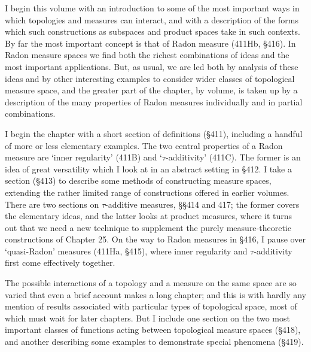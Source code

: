       
\def\chaptername{Topologies and Measures I} 
\def\chaptername{Topologies and measures I} 
      
I begin this volume with an introduction to some of the most important 
ways in which topologies and measures can interact, and with a 
description of 
the forms which such constructions as subspaces and product spaces take 
in such contexts.   By far the most important concept is that of Radon 
measure (411Hb, \S416).   In Radon measure spaces we find both the 
richest combinations of ideas and the most important applications. 
But, as usual, we are led both by analysis of these ideas and by other 
interesting examples to consider wider classes of topological measure 
space, and the 
greater part of the chapter, by volume, is taken up by a description of 
the many properties of Radon measures individually and in partial 
combinations. 
      
I begin the chapter with a short section of definitions (\S411), 
including a handful of more or less elementary examples.   The two 
central properties 
of a Radon measure are `inner regularity' (411B) and `$\tau$-additivity' 
(411C).   The former is an idea of great versatility which I look at in 
an abstract setting in \S412.   I take a section (\S413) to describe 
some methods of constructing measure spaces, extending the rather 
limited range of constructions offered in earlier volumes.   There are 
two sections on $\tau$-additive measures, \S\S414 and 417;  the former 
covers the elementary ideas, and the latter looks at product measures, 
where it turns out that we need a new technique to supplement the purely 
measure-theoretic constructions of Chapter 25.   On the way to Radon 
measures in \S416, I 
pause over `quasi-Radon' measures (411Ha, \S415), where inner regularity 
and $\tau$-additivity first come effectively together. 
      
The possible interactions of a topology and a measure on the same space 
are so varied that even a brief account makes a long chapter;  and this 
is with hardly any mention of results associated with particular types 
of topological space, most of which must wait for later chapters.   But 
I include one section on the two most important classes of functions 
acting between topological measure spaces (\S418), and another 
describing some examples to demonstrate special phenomena (\S419). 

\discrpage 
